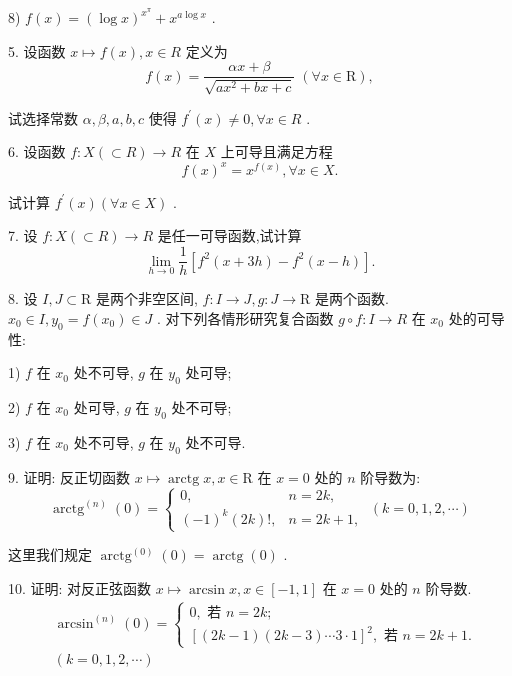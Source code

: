 8) $f\left( x\right)  = {\left( \log x\right) }^{{x}^{\pi }} + {x}^{a\log x}$ .

5. 设函数 $x \mapsto  f\left( x\right) ,x \in  R$ 定义为
$$f\left( x\right)  = \frac{{\alpha x} + \beta }{\sqrt{a{x}^{2} + {bx} + c}}\;\left( {\forall x \in  \mathrm{R}}\right) ,$$

试选择常数 $\alpha ,\beta ,a,b,c$ 使得 ${f}^{\prime }\left( x\right)  \neq  0,\forall x \in  R$ .

6. 设函数 $f : X\left( { \subset  R}\right)  \rightarrow  R$ 在 $X$ 上可导且满足方程
$$f{\left( x\right) }^{x} = {x}^{f\left( x\right) },\forall x \in  X.$$

试计算 ${f}^{\prime }\left( x\right) \left( {\forall x \in  X}\right)$ .

7. 设 $f : X\left( { \subset  R}\right)  \rightarrow  R$ 是任一可导函数,试计算
$$\mathop{\lim }\limits_{{h \rightarrow  0}}\frac{1}{h}\left\lbrack  {{f}^{2}\left( {x + {3h}}\right)  - {f}^{2}\left( {x - h}\right) }\right\rbrack  .$$

8. 设 $I,J \subset  \mathrm{R}$ 是两个非空区间, $f : I \rightarrow  J,g : J \rightarrow  \mathrm{R}$ 是两个函数. ${x}_{0} \in  I,{y}_{0} = f\left( {x}_{0}\right)  \in  J$ . 对下列各情形研究复合函数 $g \circ  f : I \rightarrow  R$ 在 ${x}_{0}$ 处的可导性:

1) $f$ 在 ${x}_{0}$ 处不可导, $g$ 在 ${y}_{0}$ 处可导;

2) $f$ 在 ${x}_{0}$ 处可导, $g$ 在 ${y}_{0}$ 处不可导;

3) $f$ 在 ${x}_{0}$ 处不可导, $g$ 在 ${y}_{0}$ 处不可导.

9. 证明: 反正切函数 $x \mapsto  \operatorname{arctg}x,x \in  \mathrm{R}$ 在 $x = 0$ 处的 $n$ 阶导数为:
$${\operatorname{arctg}}^{\left( n\right) }\left( 0\right)  = \left\{  {\begin{array}{ll} 0, & n = {2k}, \\  {\left( -1\right) }^{k}\left( {2k}\right) !, & n = {2k} + 1, \end{array}\;\left( {k = 0,1,2,\cdots }\right) }\right.$$

这里我们规定 ${\operatorname{arctg}}^{\left( 0\right) }\left( 0\right)  = \operatorname{arctg}\left( 0\right)$ .

10. 证明: 对反正弦函数 $x \mapsto  \arcsin x,x \in  \left\lbrack  {-1,1}\right\rbrack$ 在 $x = 0$ 处的 $n$ 阶导数.
\begin{align*}
	&{\arcsin }^{\left( n\right) }\left( 0\right)  = \left\{  \begin{array}{l} 0,\text{ 若 }n = {2k}; \\  {\left\lbrack  \left( 2k - 1\right) \left( 2k - 3\right) \cdots 3 \cdot  1\right\rbrack  }^{2},\text{ 若 }n = {2k} + 1. \end{array}\right.\\
	&\left( {k = 0,1,2,\cdots }\right)
\end{align*}

